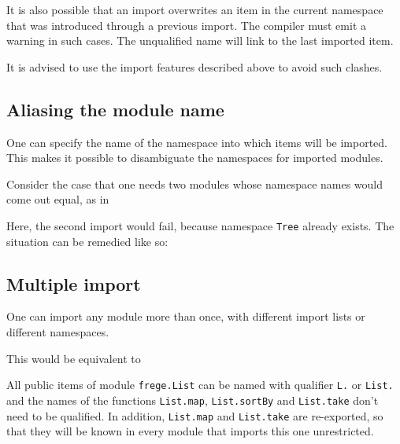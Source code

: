 It is also possible that an import overwrites an item in the current namespace that was introduced through a previous import.
The compiler must emit a warning in such cases.
The unqualified name will link to the last imported item.

It is advised to use the import features described above to avoid such clashes.

\subsection{Aliasing the module name}
One can specify the name of the namespace into which
items will be imported. This makes it possible to disambiguate the
namespaces for imported modules.

Consider the case that one needs two modules whose namespace names would come out equal, as in


Here, the second import would fail, because namespace \texttt{Tree} already
exists. The situation can be remedied like so:


\subsection{Multiple import}
One can import any module more than once, with different import
lists or different namespaces. 


This would be equivalent to 


All public items of module \texttt{frege.List} can be named with qualifier \texttt{L.} or \texttt{List.} 
and the names of the functions \texttt{List.map},  \texttt{List.sortBy} and  \texttt{List.take} don't need to be qualified. 
In addition, \texttt{List.map} and \texttt{List.take} are re-exported, so that they will be known in every module that imports this one unrestricted.

